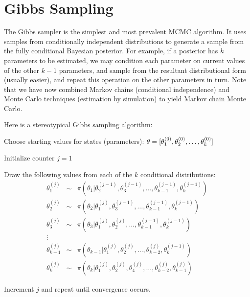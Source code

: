 
\hypertarget{gibbs-sampling}{}
\section*{Gibbs Sampling}

The Gibbs sampler is the simplest and most prevalent MCMC algorithm. It uses samples from conditionally independent distributions to generate a sample from the fully conditional Bayesian posterior. For example, if a posterior has $k$ parameters to be estimated, we may condition each parameter on current values of the other $k-1$ parameters, and sample from the resultant distributional form (usually easier), and repeat this operation on the other parameters in turn. Note that we have now combined Markov chains (conditional independence) and Monte Carlo techniques (estimation by simulation) to yield Markov chain Monte Carlo.

Here is a stereotypical Gibbs sampling algorithm:

\begin{list}{}
{}
\item Choose starting values for states (parameters): ${\bf \theta} = [\theta_1^{(0)},\theta_2^{(0)},\ldots,\theta_k^{(0)}]$
\item Initialize counter $j=1$
\item Draw the following values from each of the $k$ conditional distributions:
\begin{eqnarray*}
\theta_1^{(j)} &\sim& \pi(\theta_1 | \theta_2^{(j-1)},\theta_3^{(j-1)},\ldots,\theta_{k-1}^{(j-1)},\theta_k^{(j-1)}) \\
\theta_2^{(j)} &\sim& \pi(\theta_2 | \theta_1^{(j)},\theta_3^{(j-1)},\ldots,\theta_{k-1}^{(j-1)},\theta_k^{(j-1)}) \\
\theta_3^{(j)} &\sim& \pi(\theta_3 | \theta_1^{(j)},\theta_2^{(j)},\ldots,\theta_{k-1}^{(j-1)},\theta_k^{(j-1)}) \\
\vdots \\
\theta_{k-1}^{(j)} &\sim& \pi(\theta_{k-1} | \theta_1^{(j)},\theta_2^{(j)},\ldots,\theta_{k-2}^{(j)},\theta_k^{(j-1)}) \\
\theta_k^{(j)} &\sim& \pi(\theta_k | \theta_1^{(j)},\theta_2^{(j)},\theta_4^{(j)},\ldots,\theta_{k-2}^{(j)},\theta_{k-1}^{(j)})
\end{eqnarray*}
\item Increment $j$ and repeat until convergence occurs.
\end{list}


